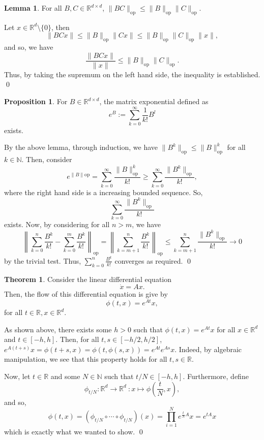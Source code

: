 \documentclass[
]{article}
\theoremstyle{definition}
\newtheorem{theorem}{Theorem}
\newtheorem{prop}{Proposition}
\theoremstyle{definition}
\newtheorem{lemma}{Lemma}[section]
\begin{document}
\begin{lemma}
  For all \(B, C \in \mathbb{R}^{d \times d}\), \(\|BC\|_\text{op} \le 
  \|B\|_\text{op}\|C\|_\text{op}\).
\end{lemma}
\proof

Let \(x \in \mathbb{R}^d\setminus\{0\}\), then
\[\|BC x \| \le \|B\|_\text{op}\|Cx\| \le \|B\|_\text{op}\|C\|_\text{op} \|x\|,\]
and so, we have
\[\frac{\|BCx\|}{\|x\|} \le \|B\|_\text{op}\|C\|_\text{op}.\] Thus, by
taking the supremum on the left hand side, the inequality is
established. \qed

\begin{prop}
  For \(B \in \mathbb{R}^{d \times d}\), the matrix exponential defined as 
  \[e^{B} := \sum_{k = 0}^\infty \frac{1}{k!} B^l\]
  exists.
\end{prop}
\proof

By the above lemma, through induction, we have
\(\|B^k\|_\text{op} \le \|B\|_\text{op}^k\) for all
\(k \in \mathbb{N}\). Then, consider
\[e^{\|B\|\text{op}} = \sum_{k = 0}^\infty \frac{\|B\|_\text{op}^k}{k!} \ge 
    \sum_{k = 0}^\infty \frac{\|B^k\|_\text{op}}{k!},\] where the right
hand side is a increasing bounded sequence. So,
\[\sum_{k = 0}^\infty \frac{\|B^k\|_\text{op}}{k!}\] exists. Now, by
considering for all \(n > m\), we have
\[\left\|\sum_{k = 0}^n \frac{B^k}{k!} - \sum_{k = 0}^m \frac{B^k}{k!}\right\|_\text{op} 
    = \left\|\sum_{k = m + 1}^n \frac{B^k}{k!}\right\|_\text{op}
    \le \sum_{k = m + 1}^n \frac{\|B^k\|_\text{op}}{k!} \to 0\] by the
trivial test. Thus, \(\sum_{k = 0}^n \frac{B^k}{k!}\) converges as
required. \qed

\begin{theorem}
  Consider the linear differential equation 
  \[\dot x = A x.\]
  Then, the flow of this differential equation is give by 
  \[\phi(t, x) = e^{At} x,\]
  for all \(t \in \mathbb{R}, x \in \mathbb{R}^d\).
\end{theorem}
\proof

As shown above, there exists some \(h > 0\) such that
\(\phi(t, x) = e^{At} x\) for all \(x \in \mathbb{R}^d\) and
\(t \in [-h, h]\). Then, for all \(t, s \in [-h/2, h/2]\),
\(e^{A(t + s)}x = \phi(t + s, x) = \phi(t, \phi(s, x))  = e^{At}e^{As}x\).
Indeed, by algebraic manipulation, we see that this property holds for
all \(t, s \in \mathbb{R}\).

Now, let \(t \in \mathbb{R}\) and some \(N \in \mathbb{N}\) such that
\(t / N \in [-h, h]\). Furthermore, define
\[\phi_{t / N} : \mathbb{R}^d \to \mathbb{R}^d\ : x \mapsto \phi\left(\frac{t}{N}, x\right),\]
and so,
\[\phi(t, x) = (\phi_{t / N} \circ \cdots \circ \phi_{t / N})(x) = 
    \prod_{i = 1}^N e^{\frac{t}{N}A} x = e^{tA}x\] which is exactly what
we wanted to show. \qed
\end{document}
